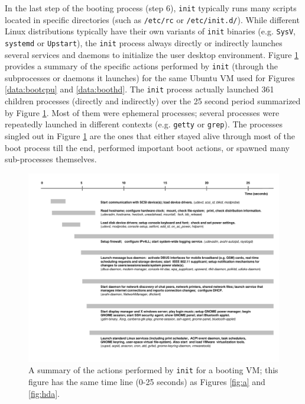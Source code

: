 In the last step of the booting
process (step 6), \texttt{init} typically
runs many scripts located in 
specific directories (such as \texttt{/etc/rc}
or \texttt{/etc/init.d/}). While different Linux distributions
typically have their own variants of \texttt{init} binaries
(e.g. \texttt{SysV}, \texttt{systemd} or \texttt{Upstart}),
the \texttt{init} process always directly or indirectly launches several 
services and daemons to initialize the user desktop
environment. Figure \ref{boot:services} provides a
summary of the specific actions performed by \texttt{init} 
(through the subprocesses or daemons it launches)
for the same Ubuntu VM used for 
Figures \ref{data:bootcpu} and \ref{data:boothd}.
The \texttt{init} process actually launched 361 children processes (directly
and indirectly) over the 25 second period summarized by Figure \ref{boot:services}.
Most of them were ephemeral processes; several processes were repeatedly launched
in different contexts (e.g. \texttt{getty} or \texttt{grep}). The processes singled out
in Figure \ref{boot:services} are the ones that either 
stayed alive through most of the boot process till the end, performed important
boot actions, or spawned many sub-processes themselves.

\begin{figure}[]
  \center
  \includegraphics[width=1.0\textwidth, trim=0.5cm 1cm 1cm 1cm]{boottimeline.pdf}
  \caption[A summary of the actions performed by \texttt{init} for a booting VM]%
  {A summary of the actions performed by \texttt{init} for a booting VM;
  this figure has the same time line (0-25 seconds) as Figures \ref{fig:a} and 
  \ref{fig:hda}.}
  \label{boot:services}
\end{figure}


